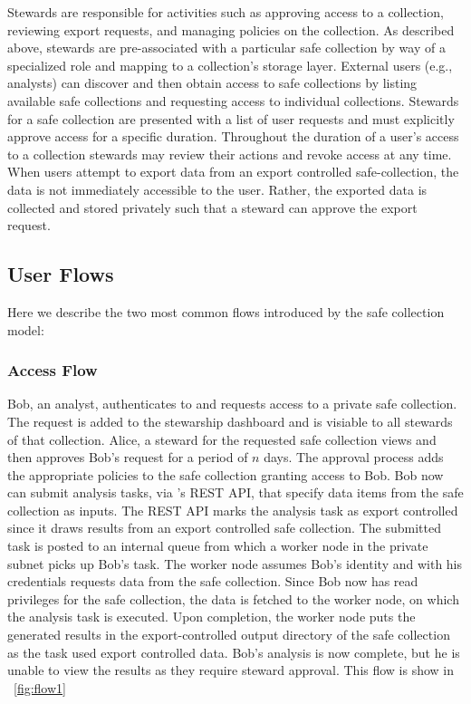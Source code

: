 Stewards are responsible for activities such as approving access to a collection, reviewing
export requests, and managing policies on the collection. 
As described above, stewards are pre-associated with a particular safe collection by
way of a specialized role and mapping to a collection's storage layer. 
External users (e.g., analysts) can discover
and then obtain access to safe collections by listing available safe collections and requesting
access to individual collections.
Stewards for a safe collection are presented with a list of user requests and must explicitly approve access
for a specific duration. Throughout the duration of a user's access to a collection
stewards may review their actions and revoke access at any time. When users attempt
to export data from an export controlled safe-collection, the data is not immediately
accessible to the user. Rather, the exported data is collected and stored privately
such that a steward can approve the export request. 


\subsection{User Flows}

Here we describe the two most common flows introduced by the safe collection model:

\subsubsection{Access Flow}

Bob, an analyst, authenticates to \NAME and requests access to a private safe collection.
The request is added to the stewarship dashboard and is visiable to all stewards
of that collection. Alice, a steward for the requested
safe collection views and then approves Bob's request for a period of $n$ days. 
The approval process adds the appropriate policies to the
safe collection granting access to Bob. Bob now can submit analysis tasks, via 
\NAMENS's REST API, that specify data items from the safe collection as inputs. 
The REST API marks the analysis task as export controlled since it draws results
from an export controlled safe collection. 
The submitted task is posted to an internal queue from which a
worker node in the \NAME private subnet picks up Bob's task. The worker node assumes Bob's identity and with
his credentials requests data from the safe collection. Since Bob now has read privileges for the
safe collection, the data is fetched to the worker node, on which the analysis task is executed.
Upon completion, the worker node puts the generated results in the export-controlled 
output directory of the safe collection as the task used export controlled data. 
Bob's analysis is now complete, but he is unable to view the
results as they require steward approval. This flow is show in \figurename~\ref{fig:flow1}

